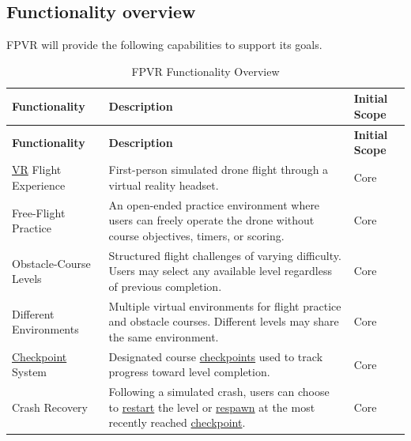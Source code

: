 \documentclass[12pt]{article}
\begin{document}
\subsection{Functionality overview}\label{g4}

FPVR will provide the following capabilities to support
its goals.


\begingroup
\small
\begin{longtable}{
    @{}p{4.0cm} p{\dimexpr\textwidth-6.4cm-4\tabcolsep\relax} p{2.4cm}@{}
}
\caption{FPVR Functionality Overview}
\label{tab:functionality-overview} \\
\toprule
\textbf{Functionality} &
\textbf{Description} &
\textbf{Initial Scope} \\
\midrule
\endfirsthead
\toprule
\textbf{Functionality} &
\textbf{Description} &
\textbf{Initial Scope} \\
\midrule
\endhead

\hyperlink{glos:VR}{VR} Flight Experience &
First-person simulated drone flight through a virtual
reality headset. &
Core \\

\addlinespace

Free-Flight Practice &
An open-ended practice environment where users can
freely operate the drone without course objectives,
timers, or scoring. &
Core \\

\addlinespace

Obstacle-Course Levels &
Structured flight challenges of varying difficulty.
Users may select any available level regardless of
previous completion. &
Core \\

\addlinespace

Different Environments &
Multiple virtual environments for flight practice and
obstacle courses. Different levels may share the same
environment. &
Core \\

\addlinespace

\hyperlink{glos:Checkpoint}{Checkpoint} System &
Designated course \hyperlink{glos:Checkpoint}{checkpoints} used to track progress
toward level completion. &
Core \\

\addlinespace

Crash Recovery &
Following a simulated crash, users can choose to
\hyperlink{glos:Respawn}{restart} the level or \hypertarget{gl:Respawn}{}\hyperlink{glos:Respawn}{respawn} at the most recently
reached \hyperlink{glos:Checkpoint}{checkpoint}. &
Core \\


\end{longtable}
\end{document}
